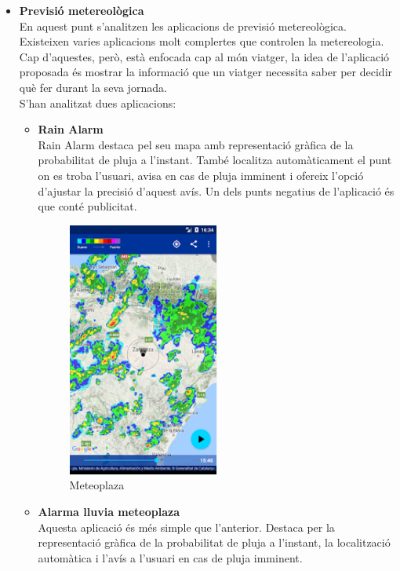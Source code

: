 \begin{itemize}
\begin{itemize}
\end{itemize}
\item{\textbf{Previsió metereològica}}\\
En aquest punt s’analitzen les aplicacions de previsió metereològica. Existeixen varies aplicacions molt complertes que controlen la metereologia. Cap d’aquestes, però, està enfocada cap al món viatger, la idea de l’aplicació proposada és mostrar la informació que un viatger necessita saber per decidir què fer durant la seva jornada.\\
S’han analitzat dues aplicacions:
\begin{itemize}
\item{\textbf{Rain Alarm}}\\
Rain Alarm destaca pel seu mapa amb representació gràfica de la probabilitat de pluja a l’instant. També localitza automàticament el punt on es troba l’usuari, avisa en cas de pluja imminent i ofereix l’opció d’ajustar la precisió d’aquest avís. Un dels punts negatius de l’aplicació és que conté publicitat.

\clearpage

\begin{figure}[!h]
\centering
\includegraphics[scale=0.90]{Figures/rainAlarm.jpg}
\caption{Meteoplaza}
\end{figure}

\item{\textbf{Alarma lluvia meteoplaza}}\\
Aquesta aplicació és més simple que l’anterior. Destaca per la representació gràfica de la probabilitat de pluja a l’instant, la localització automàtica i l’avís a l’usuari en cas de pluja imminent.


\end{itemize}
\end{itemize}
